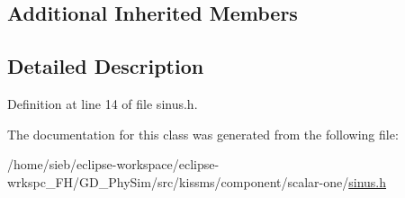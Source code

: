 \subsection*{Additional Inherited Members}


\subsection{Detailed Description}


Definition at line 14 of file sinus.\-h.



The documentation for this class was generated from the following file\-:\begin{DoxyCompactItemize}
\item 
/home/sieb/eclipse-\/workspace/eclipse-\/wrkspc\-\_\-\-F\-H/\-G\-D\-\_\-\-Phy\-Sim/src/kissms/component/scalar-\/one/\hyperlink{sinus_8h}{sinus.\-h}\end{DoxyCompactItemize}
